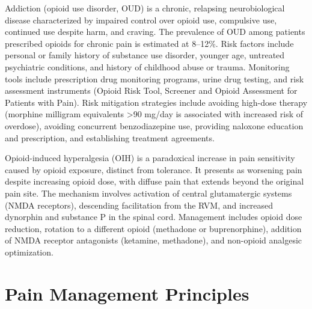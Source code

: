 Addiction (opioid use disorder, OUD) is a chronic, relapsing neurobiological disease characterized by impaired control over opioid use, compulsive use, continued use despite harm, and craving. The prevalence of OUD among patients prescribed opioids for chronic pain is estimated at 8--12\%. Risk factors include personal or family history of substance use disorder, younger age, untreated psychiatric conditions, and history of childhood abuse or trauma. Monitoring tools include prescription drug monitoring programs, urine drug testing, and risk assessment instruments (Opioid Risk Tool, Screener and Opioid Assessment for Patients with Pain). Risk mitigation strategies include avoiding high-dose therapy (morphine milligram equivalents >90 mg/day is associated with increased risk of overdose), avoiding concurrent benzodiazepine use, providing naloxone education and prescription, and establishing treatment agreements.

Opioid-induced hyperalgesia (OIH) is a paradoxical increase in pain sensitivity caused by opioid exposure, distinct from tolerance. It presents as worsening pain despite increasing opioid dose, with diffuse pain that extends beyond the original pain site. The mechanism involves activation of central glutamatergic systems (NMDA receptors), descending facilitation from the RVM, and increased dynorphin and substance P in the spinal cord. Management includes opioid dose reduction, rotation to a different opioid (methadone or buprenorphine), addition of NMDA receptor antagonists (ketamine, methadone), and non-opioid analgesic optimization.

\section{Pain Management Principles}







